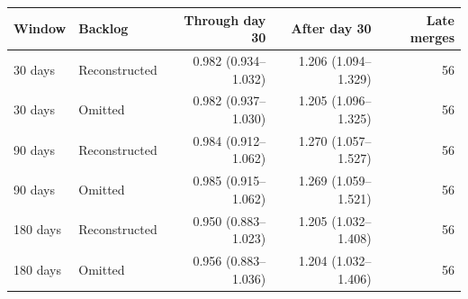\begin{tabular}{llrrr}
\toprule
Window & Backlog & Through day 30 & After day 30 & Late merges \\
\midrule
30 days & Reconstructed & 0.982 (0.934--1.032) & 1.206 (1.094--1.329) & 56 \\
30 days & Omitted & 0.982 (0.937--1.030) & 1.205 (1.096--1.325) & 56 \\
90 days & Reconstructed & 0.984 (0.912--1.062) & 1.270 (1.057--1.527) & 56 \\
90 days & Omitted & 0.985 (0.915--1.062) & 1.269 (1.059--1.521) & 56 \\
180 days & Reconstructed & 0.950 (0.883--1.023) & 1.205 (1.032--1.408) & 56 \\
180 days & Omitted & 0.956 (0.883--1.036) & 1.204 (1.032--1.406) & 56 \\
\bottomrule
\end{tabular}

